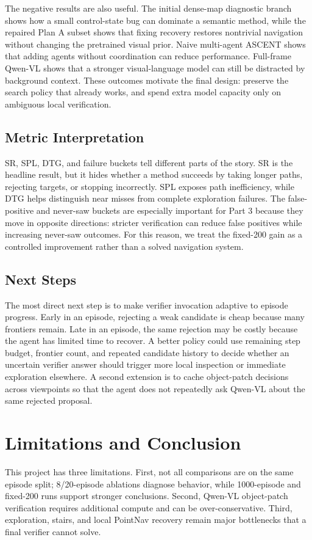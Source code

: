 \documentclass[10pt,twocolumn,letterpaper]{article}
\begin{document}
The negative results are also useful. The initial dense-map diagnostic branch shows how a small control-state bug can dominate a semantic method, while the repaired Plan A subset shows that fixing recovery restores nontrivial navigation without changing the pretrained visual prior. Naive multi-agent ASCENT shows that adding agents without coordination can reduce performance. Full-frame Qwen-VL shows that a stronger visual-language model can still be distracted by background context. These outcomes motivate the final design: preserve the search policy that already works, and spend extra model capacity only on ambiguous local verification.

\subsection{Metric Interpretation}
SR, SPL, DTG, and failure buckets tell different parts of the story. SR is the headline result, but it hides whether a method succeeds by taking longer paths, rejecting targets, or stopping incorrectly. SPL exposes path inefficiency, while DTG helps distinguish near misses from complete exploration failures. The false-positive and never-saw buckets are especially important for Part 3 because they move in opposite directions: stricter verification can reduce false positives while increasing never-saw outcomes. For this reason, we treat the fixed-200 gain as a controlled improvement rather than a solved navigation system.

\subsection{Next Steps}
The most direct next step is to make verifier invocation adaptive to episode progress. Early in an episode, rejecting a weak candidate is cheap because many frontiers remain. Late in an episode, the same rejection may be costly because the agent has limited time to recover. A better policy could use remaining step budget, frontier count, and repeated candidate history to decide whether an uncertain verifier answer should trigger more local inspection or immediate exploration elsewhere. A second extension is to cache object-patch decisions across viewpoints so that the agent does not repeatedly ask Qwen-VL about the same rejected proposal.

\section{Limitations and Conclusion}
This project has three limitations. First, not all comparisons are on the same episode split; 8/20-episode ablations diagnose behavior, while 1000-episode and fixed-200 runs support stronger conclusions. Second, Qwen-VL object-patch verification requires additional compute and can be over-conservative. Third, exploration, stairs, and local PointNav recovery remain major bottlenecks that a final verifier cannot solve.
\end{document}
